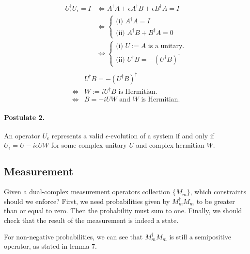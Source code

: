 \documentclass{article}
\newcommand{\e}{\epsilon}
\begin{document}
\begin{equation}
 \begin{split}
  U_\e^\dagger U_\e = I &\iff A^\dagger A + \e A^\dagger B + \e B^\dagger A = I\\
                        &\iff \begin{cases}
      \text{(i) } A^\dagger A = I \\
      \text{(ii) } A^\dagger B + B^\dagger A = 0
   \end{cases}\\
                        &\iff \begin{cases}
      \text{(i) } U := A \text{ is a unitary.} \\
      \text{(ii) } U^\dagger B = - (U^\dagger B)^\dagger
   \end{cases}\\
 \end{split}
\end{equation}
\begin{equation}
 \begin{split}
      &U^\dagger B = - (U^\dagger B)^\dagger\\
      \iff &W := i U^\dagger B  \text{ is Hermitian.}\\
      \iff &B = -iUW \text{ and } W \text{ is Hermitian.}
 \end{split}
\end{equation}


\paragraph{Postulate 2.} An operator $U_\e$ represents a valid $\e$-evolution of a system if and only if $U_\e = U - i \e U W$ for some complex unitary $U$ and complex hermitian $W$.

\subsection{Measurement}

Given a dual-complex measurement operators collection $\{M_m\}$, which constraints should we enforce? First, we need probabilities given by $M_m^\dagger M_m$ to be greater than or equal to zero. Then the probability must sum to one. Finally, we should check that the result of the measurement is indeed a state.

For non-negative probabilities, we can see that $M_m^\dagger M_m$ is still a semipositive operator, as stated in lemma 7.
\end{document}
